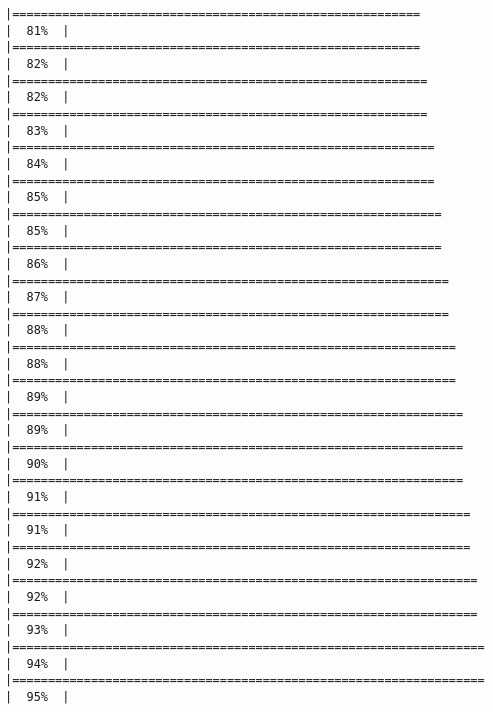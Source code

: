 \documentclass[
]{article}
\begin{document}
\begin{verbatim}
|=========================================================             |  81%  |                                                                              |=========================================================             |  82%  |                                                                              |==========================================================            |  82%  |                                                                              |==========================================================            |  83%  |                                                                              |===========================================================           |  84%  |                                                                              |===========================================================           |  85%  |                                                                              |============================================================          |  85%  |                                                                              |============================================================          |  86%  |                                                                              |=============================================================         |  87%  |                                                                              |=============================================================         |  88%  |                                                                              |==============================================================        |  88%  |                                                                              |==============================================================        |  89%  |                                                                              |===============================================================       |  89%  |                                                                              |===============================================================       |  90%  |                                                                              |===============================================================       |  91%  |                                                                              |================================================================      |  91%  |                                                                              |================================================================      |  92%  |                                                                              |=================================================================     |  92%  |                                                                              |=================================================================     |  93%  |                                                                              |==================================================================    |  94%  |                                                                              |==================================================================    |  95%  |                                                                              
\end{verbatim}
\end{document}
